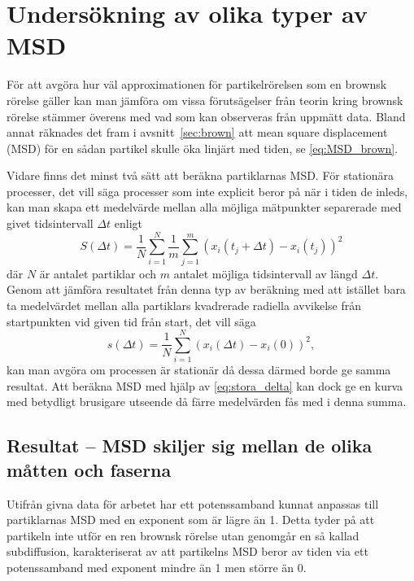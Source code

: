     




\section{Undersökning av olika typer av MSD}

För att avgöra hur väl approximationen för partikelrörelsen som en brownsk rörelse gäller kan man jämföra om vissa förutsägelser från teorin kring brownsk rörelse stämmer överens med vad som kan observeras från uppmätt data. Bland annat räknades det fram i avsnitt~\ref{sec:brown} att mean square displacement (MSD) för en sådan partikel skulle öka linjärt med tiden, se \eqref{eq:MSD_brown}.

Vidare finns det minst två sätt att beräkna partiklarnas MSD. För stationära processer, det vill säga processer som inte explicit beror på när i tiden de inleds, kan man skapa ett medelvärde mellan alla möjliga mätpunkter separerade med givet tidsintervall $\Delta{t}$ enligt
\begin{equation} \label{eq:lilla_delta}
    S(\Delta t)= \frac{1}{N}\sum^N_{i=1}\frac{1}{m}\sum^m_{j=1}(x_i(t_j+\Delta t)-x_i(t_j))^2
\end{equation} 
där $N$ är antalet partiklar och $m$ antalet möjliga tidsintervall av längd $\Delta t$.
Genom att jämföra resultatet från denna typ av beräkning med att istället bara ta medelvärdet mellan alla partiklars kvadrerade radiella avvikelse från startpunkten vid given tid från start, det vill säga
\begin{equation} \label{eq:stora_delta}%
    s(\Delta t)= \frac{1}{N}\sum^N_{i=1}(x_i(\Delta t)-x_i(0))^2,
\end{equation} 
kan man avgöra om processen är stationär då dessa därmed borde ge samma resultat. Att beräkna MSD med hjälp av \eqref{eq:stora_delta} kan dock ge en kurva med betydligt brusigare utseende då färre medelvärden fås med i denna summa. 

\subsection{Resultat -- MSD skiljer sig mellan de olika måtten och faserna}
Utifrån givna data för arbetet har ett potenssamband kunnat anpassas till partiklarnas MSD med en exponent som är lägre än 1. Detta tyder på att partikeln inte utför en ren brownsk rörelse utan genomgår en så kallad subdiffusion, karakteriserat av att partikelns MSD beror av tiden via ett potenssamband med exponent mindre än 1 men större än 0.

